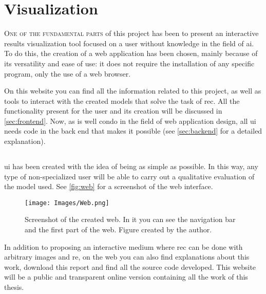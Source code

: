 

\chapter{Visualization}\label{cha:web}



\lettrine{O}{ne of the fundamental parts} of this project has been to present
an interactive results visualization tool focused on a user without knowledge
in the field of \gls{ai}. To do this, the creation of a web application has
been chosen, mainly because of its versatility and ease of use: it does not
require the installation of any specific program, only the use of a web
browser.

On this website you can find all the information related to this project, as
well as tools to interact with the created models that solve the task of
\gls{rec}. All the functionality present for the user and its creation will be
discussed in \vref{sec:frontend}. Now, as is well condo in the field of web
application design, all \gls{ui} needs code in the back end that makes it
possible (see \vref{sec:backend} for a detailed explanation).



\section{}%
\label{sec:frontend}

\gls{ui} has been created with the idea of being as simple as possible. In this
way, any type of non-specialized user will be able to carry out a qualitative
evaluation of the model used. See \vref{fig:web} for a screenshot of the web
interface.

\begin{figure}[ht]
  \centering
  \texttt{[image: Images/Web.png]}
  \caption[Screenshot of the created web]{Screenshot of the created web. In it
    you can see the navigation bar and the first part of the web. Figure
    created by the author.}\label{fig:web}
\end{figure}

In addition to proposing an interactive medium where \gls{rec} can be done with
arbitrary images and \gls{re}, on the web you can also find explanations about
this work, download this report and find all the source code developed. This
website will be a public and transparent online version containing all the work
of this thesis.

